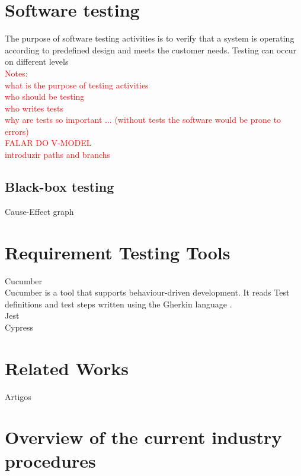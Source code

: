 \section{Software testing}
\label{sec:software_testing}

The purpose of software testing activities is to verify that a system is operating according to predefined design and meets the customer needs.
Testing can occur on different levels 
\\
\textcolor{red}{
Notes:\\
what is the purpose of testing activities\\
who should be testing\\
who writes tests\\
why are tests so important ... (without tests the software would be prone to errors)\\
FALAR DO V-MODEL\\
introduzir paths and branchs
}


\subsection{Black-box testing}
\label{subsec:black-box testing}

Cause-Effect graph 


\section{Requirement Testing Tools}
\label{subsec:requirement_testing}

Cucumber\\
Cucumber is a tool that supports behaviour-driven development. It reads Test definitions and test steps written using the Gherkin language \cite{cucumber}.\\

Jest\\
Cypress\\

\section{Related Works}
\label{sec:related_works}

Artigos\\

\section{Overview of the current industry procedures}
\label{sec:current_procedures}

